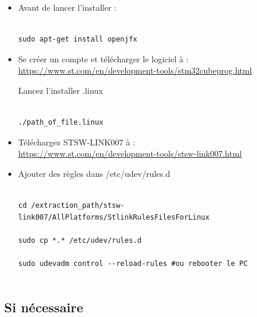 \documentclass{article}
\begin{document}
\begin{itemize}
   



 \item Avant de lancer l'installer :
\begin{verbatim}

sudo apt-get install openjfx

\end{verbatim}

 \item Se créer un compte et télécharger le logiciel à : \\

\url{https://www.st.com/en/development-tools/stm32cubeprog.html}


Lancez l'installer .linux 
\begin{verbatim}

./path_of_file.linux

\end{verbatim}



\item Téléchargez STSW-LINK007 à : \\ 
\url{https://www.st.com/en/development-tools/stsw-link007.html}


\item Ajouter des règles dans /etc/udev/rules.d

\begin{verbatim}

cd /extraction_path/stsw-link007/AllPlatforms/StlinkRulesFilesForLinux

sudo cp *.* /etc/udev/rules.d

sudo udevadm control --reload-rules #ou rebooter le PC


\end{verbatim}

\end{itemize}

\subsection{Si nécessaire}
\end{document}
